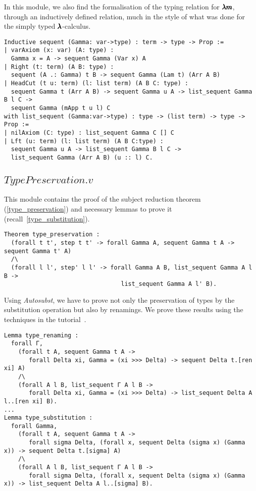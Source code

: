 In this module, we also find the formalisation of the typing relation for $\pmb{\lambda m}$, through an inductively defined relation, much in the style of what was done for the simply typed $\pmb{\lambda}$-calculus.
\begin{lstlisting}[language=Coq]
Inductive sequent (Gamma: var->type) : term -> type -> Prop := 
| varAxiom (x: var) (A: type) :
  Gamma x = A -> sequent Gamma (Var x) A
| Right (t: term) (A B: type) :
  sequent (A .: Gamma) t B -> sequent Gamma (Lam t) (Arr A B)
| HeadCut (t u: term) (l: list term) (A B C: type) :
  sequent Gamma t (Arr A B) -> sequent Gamma u A -> list_sequent Gamma B l C ->
  sequent Gamma (mApp t u l) C
with list_sequent (Gamma:var->type) : type -> (list term) -> type -> Prop :=
| nilAxiom (C: type) : list_sequent Gamma C [] C
| Lft (u: term) (l: list term) (A B C:type) :
  sequent Gamma u A -> list_sequent Gamma B l C ->
  list_sequent Gamma (Arr A B) (u :: l) C.
\end{lstlisting}

\subsection{\lst$TypePreservation.v$}

This module contains the proof of the subject reduction theorem (\cref{type_preservation}) and necessary lemmas to prove it (recall~\cref{type_substitution}).

\begin{lstlisting}[language=Coq]
Theorem type_preservation :
  (forall t t', step t t' -> forall Gamma A, sequent Gamma t A -> sequent Gamma t' A)
  /\
  (forall l l', step' l l' -> forall Gamma A B, list_sequent Gamma A l B ->
                                 list_sequent Gamma A l' B).
\end{lstlisting}

Using \textit{Autosubst}, we have to prove not only the preservation of types by the substitution operation but also by renamings.
We prove these results using the techniques in the tutorial~\cite{AutosubstManual}.

\begin{lstlisting}[language=Coq]
Lemma type_renaming :
  forall Γ,
    (forall t A, sequent Gamma t A ->
       forall Delta xi, Gamma = (xi >>> Delta) -> sequent Delta t.[ren xi] A)
    /\
    (forall A l B, list_sequent Γ A l B ->
       forall Delta xi, Gamma = (xi >>> Delta) -> list_sequent Delta A l..[ren xi] B).
...
Lemma type_substitution :
  forall Gamma, 
    (forall t A, sequent Gamma t A ->
       forall sigma Delta, (forall x, sequent Delta (sigma x) (Gamma x)) -> sequent Delta t.[sigma] A)
    /\
    (forall A l B, list_sequent Γ A l B ->
       forall sigma Delta, (forall x, sequent Delta (sigma x) (Gamma x)) -> list_sequent Delta A l..[sigma] B).
\end{lstlisting}

